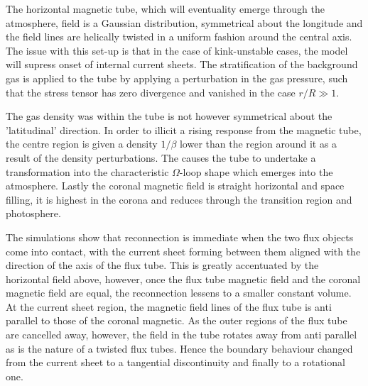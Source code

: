 The horizontal magnetic tube, which will eventuality emerge through the atmosphere, field is a Gaussian distribution, symmetrical about the longitude and the field lines are helically twisted in a uniform fashion around the central axis.
The issue with this set-up is that in the case of kink-unstable cases, the model will supress onset of internal current sheets. 
The stratification of the background gas is applied to the tube by applying a perturbation in the gas pressure, such that the stress tensor has zero divergence and vanished in the case $r/R \gg 1$.

The gas density was within the tube is not however symmetrical about the 'latitudinal' direction.
In order to illicit a rising response from the magnetic tube, the centre region is given a density $1/\beta$ lower than the region around it as a result of the density perturbations.
The causes the tube to undertake a transformation into the characteristic $\Omega$-loop shape which emerges into the atmosphere.
Lastly the coronal magnetic field is straight horizontal and space filling, it is highest in the corona and reduces through the transition region and photosphere.

The simulations show that reconnection is immediate when the two flux objects come into contact, with the current sheet forming between them aligned with the direction of the axis of the flux tube.
This is greatly accentuated by the horizontal field above, however, once the flux tube magnetic field and the coronal magnetic field are equal, the reconnection lessens to a smaller constant volume. 
At the current sheet region, the magnetic field lines of the flux tube is anti parallel to those of the coronal magnetic.
As the outer regions of the flux tube are cancelled away, however, the field in the tube rotates away from anti parallel as is the nature of a twisted flux tubes.
Hence the boundary behaviour changed from the current sheet to a tangential discontinuity and finally to a rotational one.

